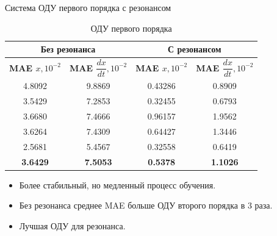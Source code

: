 \documentclass{beamer}
\begin{document}
\begin{frame}{Система ОДУ первого порядка с резонансом}
    \begin{table}[h!]
        \centering
        \begin{tabular}{|c|c|c|c|}
        \hline
        \multicolumn{2}{|c|}{\textbf{Без резонанса}} & \multicolumn{2}{|c|}{\textbf{С резонансом}} \\
        \hline
        \textbf{MAE $x, 10^{-2}$} & \textbf{MAE $\dfrac{dx}{dt}, 10^{-2}$} & \textbf{MAE $x, 10^{-2}$} & \textbf{MAE $\dfrac{dx}{dt}, 10^{-2}$} \\
        \hline
        4.8092 & 9.8869 & 0.43286 & 0.8909 \\
        3.5429 & 7.2853 & 0.32455 & 0.6793 \\
        3.6680 & 7.4666 & 0.96157 & 1.9562 \\
        3.6264 & 7.4309 & 0.64427 & 1.3446 \\
        2.5681 & 5.4567 & 0.32558 & 0.6419 \\
        \hline
        \textbf{3.6429} & \textbf{7.5053} & \textbf{0.5378} & \textbf{1.1026} \\
        \hline
        \end{tabular}
        \caption{ОДУ первого порядка}
    \end{table}

    \begin{itemize}
        \item Более стабильный, но медленный процесс обучения.
        \item Без резонанса среднее MAE больше ОДУ второго порядка в 3 раза.
        \item Лучшая ОДУ для резонанса.
    \end{itemize}

\end{frame}
\end{document}
